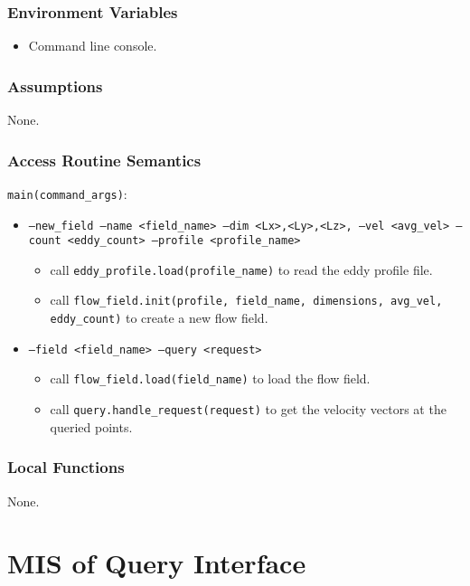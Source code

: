 \documentclass[12pt, titlepage]{article}
\begin{document}
\subsubsection{Environment Variables}
\begin{itemize}
  \item Command line console.
\end{itemize}

\subsubsection{Assumptions}
None.

\subsubsection{Access Routine Semantics}

\noindent \texttt{main(command\_args)}:
\begin{itemize}
\item \texttt{--new\_field --name <field\_name> --dim <Lx>,<Ly>,<Lz>, --vel <avg\_vel> --count <eddy\_count> --profile <profile\_name>} 
  \begin{itemize}
    \item call \texttt{eddy\_profile.load(profile\_name)} to read the eddy profile file.
    \item call \texttt{flow\_field.init(profile, field\_name, dimensions, avg\_vel, eddy\_count)} to create a new flow field.
  \end{itemize}
\item \texttt{--field <field\_name> --query <request>}
  \begin{itemize}
    \item call \texttt{flow\_field.load(field\_name)} to load the flow field.
    \item call \texttt{query.handle\_request(request)} to get the velocity vectors at the queried points.
  \end{itemize}
\end{itemize}

\subsubsection{Local Functions}

None.


\newpage
\section{MIS of Query Interface} \label{mQuery} 
\end{document}
